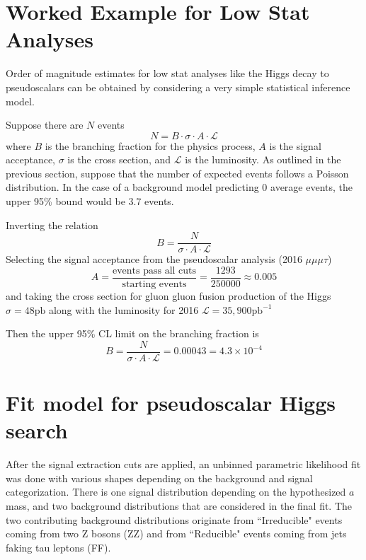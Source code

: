 \section{Worked Example for Low Stat Analyses}
Order of magnitude estimates for low stat analyses like the Higgs decay to pseudoscalars can be obtained by considering a very simple statistical inference model. 

Suppose there are $N$ events 
\begin{equation}
\label{eq:Nevents}
N = B\cdot \sigma \cdot A\cdot \mathcal{L}
\end{equation}
where $B$ is the branching fraction for the physics process, $A$ is the signal acceptance, $\sigma$ is the cross section, and $\mathcal{L}$ is the luminosity.
As outlined in the previous section, suppose that the number of expected events follows a Poisson distribution. In the case of a background model predicting 0 average events, the upper 95\% bound would be 3.7 events. 

Inverting the relation
\begin{equation}B = \frac{N}{\sigma \cdot A\cdot \mathcal{L}}\end{equation}
Selecting the signal acceptance from the pseudoscalar analysis (2016 $\mu\mu\mu\tau$) 
\begin{equation} A = \frac{\text{events pass all cuts}}{\text{starting events}} = \frac{1293}{250000} \approx 0.005 \end{equation}
and taking the cross section for gluon gluon fusion production of the Higgs $\sigma = 48 \text{pb}$ along with the luminosity for 2016 $\mathcal{L} = 35,900 \text{pb}^{-1}$

Then the upper 95\% CL limit on the branching fraction is 
\begin{equation}B =  \frac{N}{\sigma \cdot A\cdot \mathcal{L}} = 0.00043 = 4.3 \times 10^{-4}\end{equation}



\section{Fit model for pseudoscalar Higgs search}
\label{sec:fitmodel}
After the signal extraction cuts are applied, an unbinned parametric likelihood fit was done with various shapes depending on the background and signal categorization. There is one signal distribution depending on the hypothesized $a$ mass, and two background distributions that are considered in the final fit. The two contributing background distributions originate from ``Irreducible" events coming from two Z bosons (ZZ) and from ``Reducible" events coming from jets faking tau leptons (FF).  

